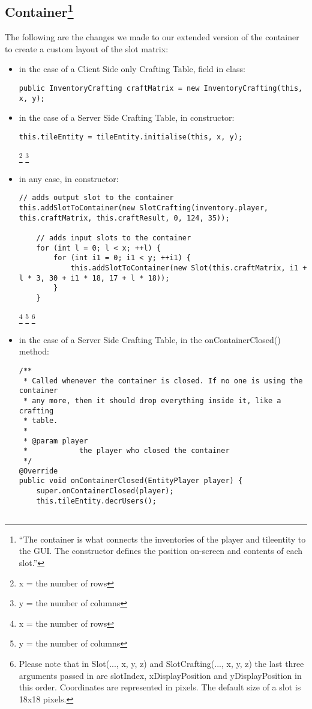 \subsection[Container]{Container\footnote{``The container is what connects the inventories of the player and tileentity to the GUI. The constructor defines the position on-screen and contents of each slot.''\cite{website:forge-container}}}
The following are the changes we made to our extended version of the container to create a custom layout of the slot matrix:
\begin{itemize}

\item in the case of a Client Side only Crafting Table, field in class:
\begin{lstlisting}
public InventoryCrafting craftMatrix = new InventoryCrafting(this, x, y);
\end{lstlisting}

\item in the case of a Server Side Crafting Table, in constructor:
\begin{lstlisting}
this.tileEntity = tileEntity.initialise(this, x, y);
\end{lstlisting}

\let\thefootnote\relax\footnote{x = the number of rows}
\let\thefootnote\relax\footnote{y = the number of columns}

\item in any case, in constructor:
\begin{lstlisting}
// adds output slot to the container
this.addSlotToContainer(new SlotCrafting(inventory.player,	this.craftMatrix, this.craftResult, 0, 124, 35));
			
	// adds input slots to the container
	for (int l = 0; l < x; ++l) {
		for (int i1 = 0; i1 < y; ++i1) {
			this.addSlotToContainer(new Slot(this.craftMatrix, i1 + l * 3, 30 + i1 * 18, 17 + l * 18));
		}
	}
\end{lstlisting}

\let\thefootnote\relax\footnote{x = the number of rows}
\let\thefootnote\relax\footnote{y = the number of columns}
\let\thefootnote\relax\footnote{Please note that in Slot(..., x, y, z) and SlotCrafting(..., x, y, z) the last three arguments passed in are slotIndex, xDisplayPosition and yDisplayPosition in this order. Coordinates are represented in pixels. The default size of a slot is 18x18 pixels.}

\item in the case of a Server Side Crafting Table, in the onContainerClosed() method:	
\begin{lstlisting}
/**
 * Called whenever the container is closed. If no one is using the container
 * any more, then it should drop everything inside it, like a crafting
 * table.
 * 
 * @param player
 *            the player who closed the container
 */
@Override
public void onContainerClosed(EntityPlayer player) {
	super.onContainerClosed(player);
	this.tileEntity.decrUsers();


\end{lstlisting}
\end{itemize}
